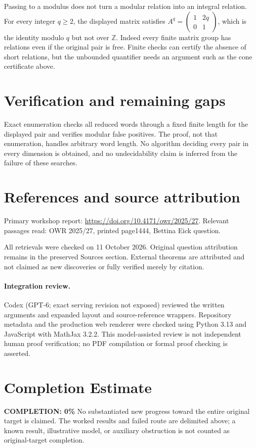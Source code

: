 \documentclass[11pt]{article}
\begin{document}
Passing to a modulus does not turn a modular relation into an integral relation. For every integer $q\ge2$, the displayed matrix satisfies $A^q=\left(\begin{smallmatrix}1&2q\\0&1\end{smallmatrix}\right)$, which is the identity modulo $q$ but not over $\mathbb Z$. Indeed every finite matrix group has relations even if the original pair is free. Finite checks can certify the absence of short relations, but the unbounded quantifier needs an argument such as the cone certificate above.
\section{Verification and remaining gaps}
Exact enumeration checks all reduced words through a fixed finite length for the displayed pair and verifies modular false positives. The proof, not that enumeration, handles arbitrary word length. No algorithm deciding every pair in every dimension is obtained, and no undecidability claim is inferred from the failure of these searches.

\section{References and source attribution}
Primary workshop report: \url{https://doi.org/10.4171/owr/2025/27}. Relevant passages read: OWR 2025/27, printed page1444, Bettina Eick question.

All retrievals were checked on 11 October 2026. Original question attribution remains in the preserved Sources section. External theorems are attributed and not claimed as new discoveries or fully verified merely by citation.


\paragraph{Integration review.} Codex (GPT-6; exact serving revision not exposed) reviewed the written arguments and expanded layout and source-reference wrappers. Repository metadata and the production web renderer were checked using Python 3.13 and JavaScript with MathJax 3.2.2. This model-assisted review is not independent human proof verification; no PDF compilation or formal proof checking is asserted.

\section{Completion Estimate}
\noindent\textbf{COMPLETION: 0\%}
No substantiated new progress toward the entire original target is claimed. The worked results and failed route are delimited above; a known result, illustrative model, or auxiliary obstruction is not counted as original-target completion.
\end{document}
